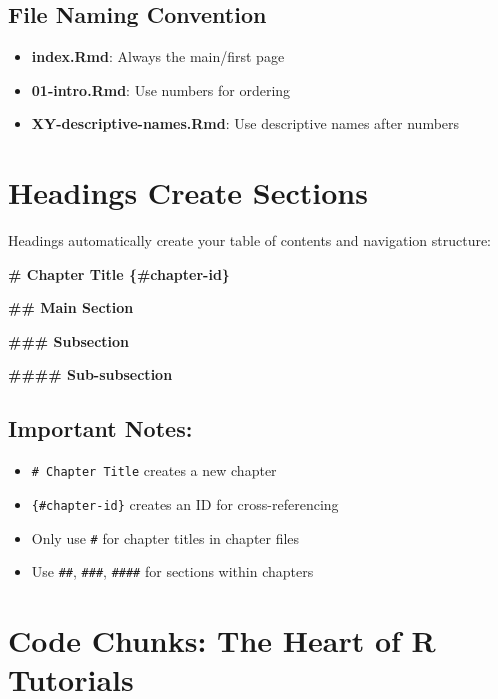 \documentclass[
]{book}
\newenvironment{Shaded}{\begin{snugshade}}{\end{snugshade}}
\newcommand{\FunctionTok}[1]{\textcolor[rgb]{0.13,0.29,0.53}{\textbf{#1}}}
\providecommand{\tightlist}{%
  \setlength{\itemsep}{0pt}\setlength{\parskip}{0pt}}
\begin{document}
\subsection{File Naming Convention}\label{file-naming-convention}

\begin{itemize}
\tightlist
\item
  \textbf{index.Rmd}: Always the main/first page
\item
  \textbf{01-intro.Rmd}: Use numbers for ordering
\item
  \textbf{XY-descriptive-names.Rmd}: Use descriptive names after numbers
\end{itemize}

\section{Headings Create Sections}\label{headings-create-sections}

Headings automatically create your table of contents and navigation structure:

\begin{Shaded}
\begin{Highlighting}[]
\FunctionTok{\# Chapter Title \{\#chapter{-}id\}}

\FunctionTok{\#\# Main Section}

\FunctionTok{\#\#\# Subsection  }

\FunctionTok{\#\#\#\# Sub{-}subsection}
\end{Highlighting}
\end{Shaded}

\subsection{Important Notes:}\label{important-notes}

\begin{itemize}
\tightlist
\item
  \texttt{\#\ Chapter\ Title} creates a new chapter
\item
  \texttt{\{\#chapter-id\}} creates an ID for cross-referencing
\item
  Only use \texttt{\#} for chapter titles in chapter files
\item
  Use \texttt{\#\#}, \texttt{\#\#\#}, \texttt{\#\#\#\#} for sections within chapters
\end{itemize}

\section{Code Chunks: The Heart of R Tutorials}\label{code-chunks-the-heart-of-r-tutorials}
\end{document}

